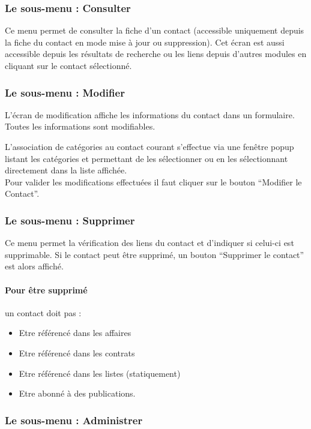 \subsubsection{Le sous-menu : Consulter}

Ce menu permet de consulter la fiche d'un contact (accessible uniquement depuis la fiche du contact en mode mise à jour ou suppression).
Cet écran est aussi accessible depuis les résultats de recherche ou les liens depuis d'autres modules en cliquant sur le contact sélectionné.

\subsubsection{Le sous-menu : Modifier}

L'écran de modification affiche les informations du contact dans un formulaire.
Toutes les informations sont modifiables.

L'association de catégories au contact courant s'effectue via une fenêtre popup listant les catégories et permettant de les sélectionner ou en les sélectionnant directement dans la liste affichée.\\

Pour valider les modifications effectuées il faut cliquer sur le bouton ``Modifier le Contact''.


\subsubsection{Le sous-menu : Supprimer}
Ce menu permet la vérification des liens du contact et d'indiquer si celui-ci est supprimable.
Si le contact peut être supprimé, un bouton ``Supprimer le contact'' est alors affiché.

\paragraph{Pour être supprimé} un contact doit pas :\\

\begin{itemize}
\item Etre référencé dans les affaires
\item Etre référencé dans les contrats
\item Etre référencé dans les listes (statiquement)
\item Etre abonné à des publications.
\end{itemize}

\subsubsection{Le sous-menu : Administrer}

